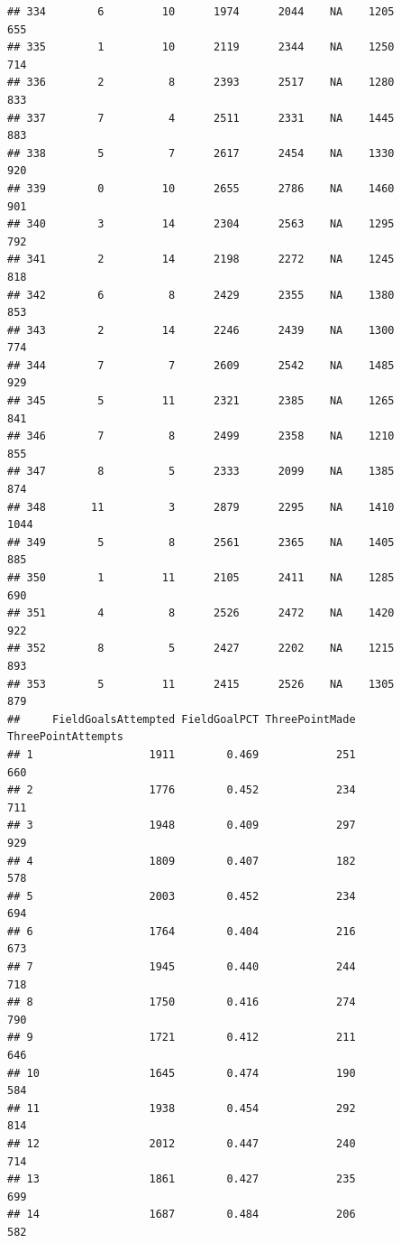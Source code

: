 \documentclass[]{book}
\begin{document}
\begin{verbatim}
## 334        6         10      1974      2044    NA    1205            655
## 335        1         10      2119      2344    NA    1250            714
## 336        2          8      2393      2517    NA    1280            833
## 337        7          4      2511      2331    NA    1445            883
## 338        5          7      2617      2454    NA    1330            920
## 339        0         10      2655      2786    NA    1460            901
## 340        3         14      2304      2563    NA    1295            792
## 341        2         14      2198      2272    NA    1245            818
## 342        6          8      2429      2355    NA    1380            853
## 343        2         14      2246      2439    NA    1300            774
## 344        7          7      2609      2542    NA    1485            929
## 345        5         11      2321      2385    NA    1265            841
## 346        7          8      2499      2358    NA    1210            855
## 347        8          5      2333      2099    NA    1385            874
## 348       11          3      2879      2295    NA    1410           1044
## 349        5          8      2561      2365    NA    1405            885
## 350        1         11      2105      2411    NA    1285            690
## 351        4          8      2526      2472    NA    1420            922
## 352        8          5      2427      2202    NA    1215            893
## 353        5         11      2415      2526    NA    1305            879
##     FieldGoalsAttempted FieldGoalPCT ThreePointMade ThreePointAttempts
## 1                  1911        0.469            251                660
## 2                  1776        0.452            234                711
## 3                  1948        0.409            297                929
## 4                  1809        0.407            182                578
## 5                  2003        0.452            234                694
## 6                  1764        0.404            216                673
## 7                  1945        0.440            244                718
## 8                  1750        0.416            274                790
## 9                  1721        0.412            211                646
## 10                 1645        0.474            190                584
## 11                 1938        0.454            292                814
## 12                 2012        0.447            240                714
## 13                 1861        0.427            235                699
## 14                 1687        0.484            206                582

\end{verbatim}
\end{document}
